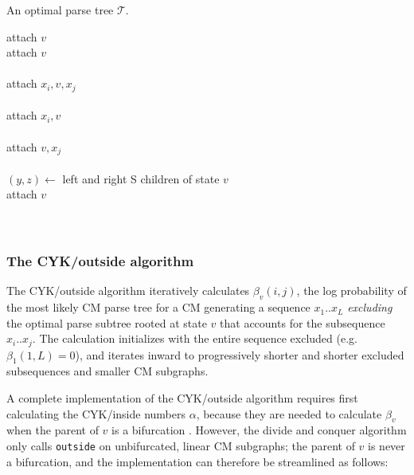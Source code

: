 \documentclass[11pt]{article}
\begin{document}
\begin{algorithm}
         {An optimal parse tree $\mathcal{T}$.}
\begin{algtab*}
    attach $v$\\
    attach $v$ \\
    \\
    attach $x_i,v,x_j$\\
    \\
    attach $x_i,v$\\
    \\
    attach $v,x_j$\\
    \\
    $(y,z) \leftarrow $ left and right S children of state $v$\\
    attach $v$\\
    \\
    \\
\algend
\end{algtab*}
\end{algorithm}

\subsubsection{The CYK/outside algorithm}

The CYK/outside algorithm iteratively calculates $\beta_v(i,j)$, the
log probability of the most likely CM parse tree for a CM generating a
sequence $x_1..x_L$ \emph{excluding} the optimal parse subtree rooted
at state $v$ that accounts for the subsequence $x_i..x_j$. The
calculation initializes with the entire sequence excluded (e.g.
$\beta_1(1,L) = 0$), and iterates inward to progressively shorter and
shorter excluded subsequences and smaller CM subgraphs.

A complete implementation of the CYK/outside algorithm requires first
calculating the CYK/inside numbers $\alpha$, because they are needed
to calculate $\beta_v$ when the parent of $v$ is a bifurcation
\cite{Lari90,Lari91,Durbin98}. However, the divide and conquer
algorithm only calls \texttt{outside} on unbifurcated, linear CM
subgraphs; the parent of $v$ is never a bifurcation, and the
implementation can therefore be streamlined as follows:
\end{document}
